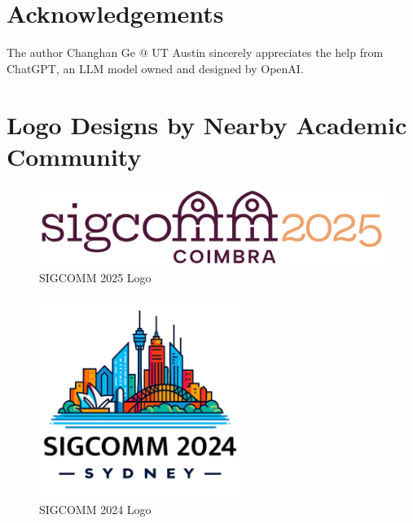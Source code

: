 \documentclass[sigconf, 10pt]{acmart}
\begin{document}
\vspace{-3pt}
\section*{Acknowledgements}
\vspace{-3pt}
The author Changhan Ge @ UT Austin sincerely appreciates the help from ChatGPT, an LLM model owned and designed by OpenAI.

\appendix
\section{Logo Designs by Nearby Academic Community}
\begin{figure}[h]
	\centering
	\includegraphics[width=\columnwidth]{./appendix/sigcomm25-logo.png}
	\caption{SIGCOMM 2025 Logo}
	\label{fig:sigcomm25logo}
\end{figure}

\begin{figure}[h]
	\centering
	\includegraphics[width=\columnwidth]{./appendix/sigcomm24-logo.png}
	\caption{SIGCOMM 2024 Logo}
	\label{fig:sigcomm24logo}
\end{figure}
\end{document}
